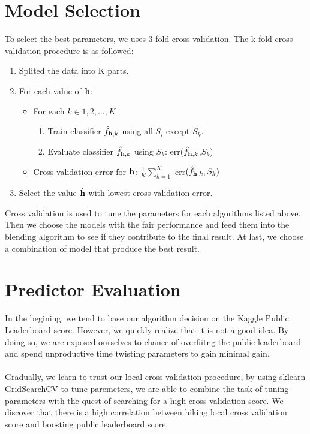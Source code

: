 \documentclass[conference]{IEEEtran}
\begin{document}
\section{Model Selection}
To select the best parameters, we uses 3-fold cross validation. The k-fold cross validation procedure is as followed:
\begin{enumerate}
\item Splited the data into K parts.
\item For each value of \(\mathbf{h}\): 
\begin{itemize}
\item For each \(k \in {1,2,\dots,K}\)
\begin{enumerate}
\item Train classifier \(\hat{f}_{\mathbf{h},k}\) using all $S_i$ except $S_k$.
\item Evaluate classifier \(\hat{f}_{\mathbf{h},k}\) using $S_k$: err(\(\hat{f}_{\mathbf{h},k}\),$S_k$)
\end{enumerate}
\item Cross-validation error for $\mathbf{h}$: \(\frac{1}{K}\sum_{k=1}^K\) err\((\hat{f}_{\mathbf{h},k},S_k)\)
\end{itemize}
\item Select the value \(\hat{\mathbf{h}}\) with lowest cross-validation error.
\end{enumerate}
\indent Cross validation is used to tune the parameters for each algorithms listed above. Then we choose the models with the fair performance and feed them into the blending algorithm to see if they contribute to the final result. At last, we choose a combination of model that produce the best result. 

\section{Predictor Evaluation}
In the begining, we tend to base our algorithm decision on the Kaggle Public Leaderboard score. However, we quickly realize that it is not a good idea. By doing so, we are exposed ourselves to chance of overfiitng the public leaderboard and spend unproductive time twisting parameters to gain minimal gain. \\ \\
Gradually, we learn to trust our local cross validation procedure, by using sklearn GridSearchCV to tune paremeters, we are able to combine the task of tuning parameters with the quest of searching for a high cross validation score. We discover that there is a high correlation between hiking local cross validation score and boosting public leaderboard score.
\end{document}
